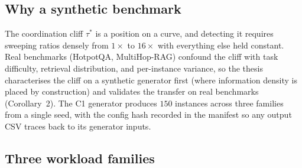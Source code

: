 \subsection{Why a synthetic benchmark}

The coordination cliff $\tau^{*}$ is a position on a curve, and
detecting it requires sweeping ratios densely from $1\times$ to
$16\times$ with everything else held constant. Real benchmarks
(HotpotQA, MultiHop-RAG) confound the cliff with task difficulty,
retrieval distribution, and per-instance variance, so the thesis
characterises the cliff on a synthetic generator first (where
information density is placed by construction) and validates the
transfer on real benchmarks (Corollary~2). The C1 generator produces
$150$ instances across three families from a single seed, with the
config hash recorded in the manifest so any output CSV traces back to
its generator inputs.

\subsection{Three workload families}
\label{sec:c1_families}

